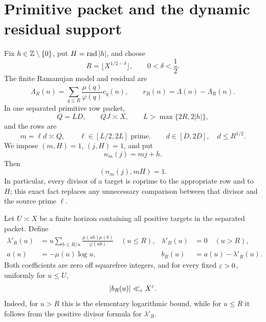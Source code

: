 \section{Primitive packet and the dynamic residual support}
\label{sec:interface}

Fix \(h\in\mathbb Z\setminus\{0\}\), put \(H=\operatorname{rad}|h|\), and choose
\begin{equation}
 R=\lfloor X^{1/2-\delta}\rfloor,
 \qquad 0<\delta<\frac12.
 \label{eq:R}
\end{equation}
The finite Ramanujan model and residual are
\begin{equation}
 \Lambda_R(n)=\sum_{q\le R}\frac{\mu(q)}{\varphi(q)}c_q(n),
 \qquad r_R(n)=\Lambda(n)-\Lambda_R(n).
 \label{eq:finite-model}
\end{equation}
In one separated primitive row packet,
\begin{equation}
 Q=LD,\qquad QJ\asymp X,\qquad
 L>\max\{2R,2|h|\},
 \label{eq:row-scales}
\end{equation}
and the rows are
\begin{equation}
 m=\ell d\asymp Q,\qquad
 \ell\in[L/2,2L]\text{ prime},\qquad
 d\in[D,2D],\quad d\le R^{1/2}.
 \label{eq:rows}
\end{equation}
We impose \((m,H)=1\), \((j,H)=1\), and put
\begin{equation}
 n_m(j)=mj+h.
 \label{eq:target}
\end{equation}
Then
\begin{equation}
 (n_m(j),mH)=1.
 \label{eq:target-coprime}
\end{equation}
In particular, every divisor of a target is coprime to the appropriate
row and to \(H\); this exact fact replaces any unnecessary comparison
between that divisor and the source prime \(\ell\).

Let \(U\asymp X\) be a finite horizon containing all positive targets
in the separated packet.  Define
\begin{align}
 \lambda'_R(u)
 &=u\sum_{b\le R/u}\frac{\mu(ub)\mu(b)}{\varphi(ub)}
 \quad(u\le R),
 &\lambda'_R(u)&=0\quad(u>R),
 \label{eq:lambda-prime}\\
 a(u)&=-\mu(u)\log u,
 &b_R(u)&=a(u)-\lambda'_R(u).
 \label{eq:a-b}
\end{align}
Both coefficients are zero off squarefree integers, and for every
fixed \(\varepsilon>0\), uniformly for \(u\le U\),
\begin{equation}
 |b_R(u)|\ll_\varepsilon X^\varepsilon.
 \label{eq:b-soft}
\end{equation}
Indeed, for \(u>R\) this is the elementary logarithmic bound, while for
\(u\le R\) it follows from the positive divisor formula for
\(\lambda'_R\).

